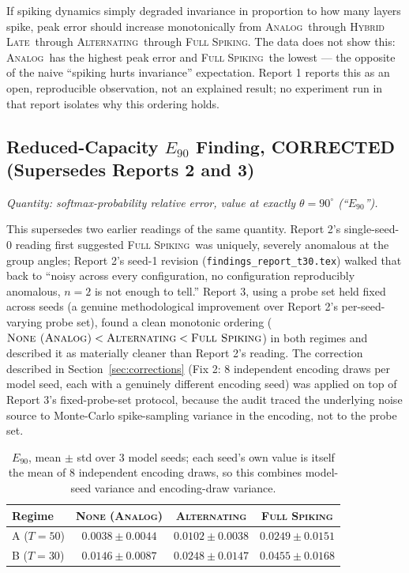 \documentclass[11pt]{article}
\newcommand{\Analog}{\textsc{Analog}}
\newcommand{\None}{\textsc{None (Analog)}}
\newcommand{\Alternating}{\textsc{Alternating}}
\newcommand{\FullSpiking}{\textsc{Full Spiking}}
\newcommand{\HybridLate}{\textsc{Hybrid Late}}
\begin{document}
If spiking dynamics simply degraded invariance in proportion to how many layers spike, peak error should
increase monotonically from \Analog\ through \HybridLate\ through \Alternating\ through \FullSpiking.
The data does not show this: \Analog\ has the highest peak error and \FullSpiking\ the lowest --- the
opposite of the naive ``spiking hurts invariance'' expectation. Report 1 reports this as an open,
reproducible observation, not an explained result; no experiment run in that report isolates why this
ordering holds.

\subsection{Reduced-Capacity $E_{90}$ Finding, CORRECTED (Supersedes Reports 2 and 3)}
\label{sec:5.3}

\textit{Quantity: softmax-probability relative error, value at exactly $\theta{=}90^\circ$ (``$E_{90}$'').}

This supersedes two earlier readings of the same quantity. Report 2's single-seed-0 reading first
suggested \FullSpiking\ was uniquely, severely anomalous at the group angles; Report 2's seed-1 revision
(\texttt{findings\_report\_t30.tex}) walked that back to ``noisy across every configuration, no
configuration reproducibly anomalous, $n{=}2$ is not enough to tell.'' Report 3, using a probe set held
fixed across seeds (a genuine methodological improvement over Report 2's per-seed-varying probe set),
found a clean monotonic ordering ($\None < \Alternating < \FullSpiking$) in both regimes and described
it as materially cleaner than Report 2's reading. The correction described in Section~\ref{sec:corrections}
(Fix 2: 8 independent encoding draws per model seed, each with a genuinely different encoding seed) was
applied on top of Report 3's fixed-probe-set protocol, because the audit traced the underlying noise
source to Monte-Carlo spike-sampling variance in the encoding, not to the probe set.

\begin{table}[H]
\centering
\begin{tabular}{@{}lccc@{}}
\toprule
\textbf{Regime} & \None & \Alternating & \FullSpiking \\
\midrule
A ($T{=}50$) & $0.0038 \pm 0.0044$ & $0.0102 \pm 0.0038$ & $0.0249 \pm 0.0151$ \\
B ($T{=}30$) & $0.0146 \pm 0.0087$ & $0.0248 \pm 0.0147$ & $0.0455 \pm 0.0168$ \\
\bottomrule
\end{tabular}
\caption{$E_{90}$, mean $\pm$ std over 3 model seeds; each seed's own value is itself the mean of 8
independent encoding draws, so this combines model-seed variance and encoding-draw variance.}
\label{tab:e90corrected}
\end{table}
\end{document}
